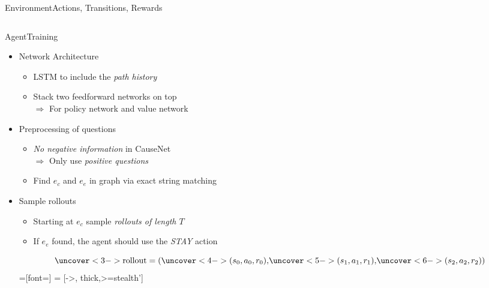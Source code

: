\documentclass[table]{beamer}
\begin{document}
\begin{frame}{Environment}{Actions, Transitions, Rewards}
\begin{columns}[T]
{}
  \end{columns}
\end{frame}

\begin{frame}{Agent}{Training}

\begin{itemize}
  \item Network Architecture
  \begin{itemize}
    \item LSTM to include the \emph{path history}
    \item Stack two feedforward networks on top\\$\Rightarrow$ For policy network and value network
  \end{itemize}

  \item<2-> Preprocessing of questions
  \begin{itemize}
    \item \emph{No negative information} in CauseNet\\$\Rightarrow$ Only use \emph{positive questions}
    \item Find $e_c$ and $e_e$ in graph via exact string matching
  \end{itemize}
  \item<3-> Sample rollouts
  \begin{itemize}
    \item Starting at $e_c$ sample \emph{rollouts of length $T$}
    \item If $e_e$ found, the agent should use the \textit{STAY} action
  \end{itemize}

  \begin{equation*}
    \uncover<3->{\text{rollout} = (} \uncover<4->{(s_0, a_0, r_0),} \uncover<5->{(s_1, a_1, r_1),} \uncover<6->{(s_2, a_2, r_2))}
  \end{equation*}
  \tikzset{>=triangle 45}
  \tikzset{every picture/.style=thick}
  =[font=\small]
     = [->, thick,>=stealth']


\end{itemize}
\end{frame}
\end{document}
